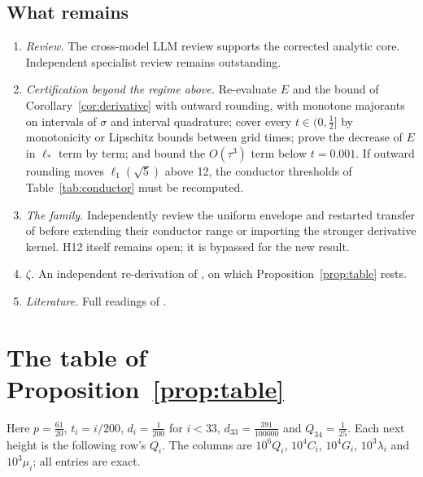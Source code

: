 \documentclass[11pt]{article}
\theoremstyle{definition}
\theoremstyle{remark}
\numberwithin{equation}{section}
\begin{document}
\subsection{What remains}

\begin{enumerate}
\item \emph{Review.} The cross-model LLM review supports the corrected
analytic core. Independent specialist review remains outstanding.
\item \emph{Certification beyond the regime above.} Re-evaluate $E$ and the bound of
Corollary~\ref{cor:derivative} with outward rounding, with monotone
majorants on intervals of $\sigma$ and interval quadrature; cover every
$t\in(0,\frac12]$ by monotonicity or Lipschitz bounds between grid times;
prove the decrease of $E$ in $\ell_*$ term by term; and bound the
$O(\tau^3)$ term below $t=0.001$. If outward rounding moves
$\ell_1(\sqrt5)$ above 12, the conductor thresholds of
Table~\ref{tab:conductor} must be recomputed.
\item \emph{The family.} Independently review the uniform envelope and
restarted transfer of \cite{r2floor,r2consumer} before extending their
conductor range or importing the stronger derivative kernel. H12 itself
remains open; it is bypassed for the new result.
\item \emph{$\zeta$.} An independent re-derivation of \cite[Lemma~3 and
Proposition~11]{hb}, on which Proposition~\ref{prop:table} rests.
\item \emph{Literature.} Full readings of
\cite{gordon,raymond,planat,gomila}.
\end{enumerate}

\clearpage
\appendix

\section{The table of Proposition~\ref{prop:table}}\label{app:table}

Here $p=\frac{61}{20}$, $t_i=i/200$, $d_i=\frac1{200}$ for $i<33$,
$d_{33}=\frac{391}{100000}$ and $Q_{34}=\frac1{25}$. Each next height is the
following row's $Q_i$. The columns are $10^6Q_i$, $10^4C_i$, $10^4G_i$,
$10^3\lambda_i$ and $10^3\mu_i$; all entries are exact.
\end{document}
